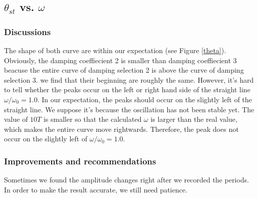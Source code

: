 \subsection{$\theta_{st}$ vs. $\omega$}
\subsubsection{Discussions}
    The shape of both curve are within our expectation (see Figure \ref{theta}). Obviously, the damping coeffiecient 2 is smaller than damping coeffiecient 3 beacuse the entire curve of damping selection 2 is above the curve of damping selection 3. we find that their beginning are roughly the same. However, it's hard to tell whether the peaks occur on the left or right hand side of the straight line $\omega/\omega_0=1.0$. In our expectation, the peaks should occur on the slightly left of the straight line. We suppose it's because the oscillation has not been stable yet. The value of $10T$ is smaller so that the calculated $\omega$ is larger than the real value, which makes the entire curve move rightwards. Therefore, the peak does not occur on the slightly left of $\omega/\omega_0=1.0$.

\subsubsection{Improvements and recommendations}
    Sometimes we found the amplitude changes right after we recorded the periods. In order to make the result accurate, we still need patience. 